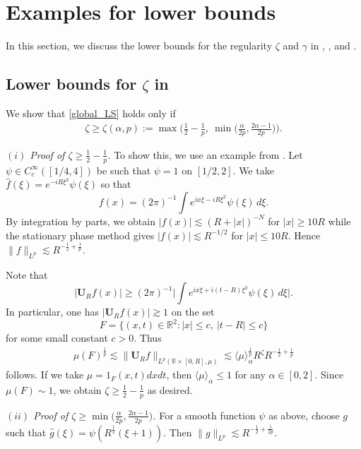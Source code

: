 \documentclass[11pt]{amsart}
\theoremstyle{definition}
\theoremstyle{remark}
\newcommand{\R}{\mathbb{R}}
\newcommand{\les}{\lesssim}
\newcommand{\inn}[1]{\langle  #1 \rangle}
\begin{document}
\section{Examples for lower bounds}\label{examp}
\newcommand{\Mtheta}{[\mu]_{\theta}}

In this section, we  discuss the lower bounds for the regularity $\zeta$ and $\gamma$ in , , and .

\subsection{Lower bounds for $\zeta$ in }\label{sec:global_low}
We show that \eqref{global_LS} holds only if
\begin{align}\label{gamma0}
\zeta \ge \zeta(\alpha,p):=\max\Big(\frac12-\frac1p, ~\min\Big(\frac{\alpha}{2p}, \frac{2\alpha-1}{2p}\Big)\Big).
\end{align}


\textit{$(i)$ Proof of $\zeta\ge \frac12-\frac1p$.}
To show this, we use an example from \cite{Rogers}. Let $\psi\in C_c^\infty([1/4,4])$ be such that $\psi=1$ on $[1/2,2]$. We take $\widehat f(\xi)=e^{-iR\xi^2}\psi(\xi)$ so that
\[
f(x)=(2\pi)^{-1}\int e^{ix\xi-iR\xi^2}\psi(\xi)\,d\xi.
\]
By integration by parts, we obtain $|f(x)|\lesssim (R+|x|)^{-N}$ for $|x|\ge 10R$
while the stationary phase method gives $|f(x)|\lesssim R^{-1/2}$ for $|x|\le 10R$. Hence 
$\|f\|_{L^p} \lesssim R^{-\frac12+\frac1p}.$

Note that
\[
|\mathbf U_Rf(x)|\ge
(2\pi)^{-1}\Big|\int e^{ix\xi+i(t-R)\xi^2}\psi(\xi)\,d\xi\Big|.
\]
In particular, one has $|\mathbf U_Rf(x)|\gtrsim 1$ on the set 
\[ F=\{(x,t)\in \R^2:|x|\le c,~|t-R|\le c\}	 \]
for some small constant $c>0$. Thus
\begin{align*}
\mu(F)^{\frac 1p}\les \big\| \mathbf U_Rf \big\|_{L^p(\R\times [0,R],\mu)}
\les \inn{\mu}_\alpha^{\frac1p} R^{\zeta}R^{-\frac12+\frac{1}{p}}
\end{align*}
follows. 
If we take $\mu=1_F(x,t)dxdt$, then $\inn{\mu}_\alpha \le1$ for any $\alpha \in [0,2]$. Since $\mu(F)\sim1$, we obtain $\zeta \ge \frac12-\frac1p$ as desired.


\textit{$(ii)$ Proof of $\zeta\ge \min\big(\frac{\alpha}{2p}, \frac{2\alpha-1}{2p}\big)$.}
For a smooth function $\psi$ as above, choose $g$ such that $\widehat{g}(\xi)=\psi(R^{\frac12}(\xi+1))$.
Then $\|g\|_{L^p} \lesssim R^{-\frac12+\frac1{2p}}$.
\end{document}
